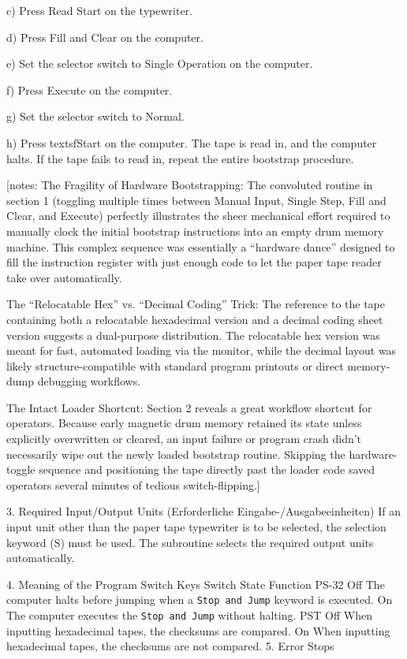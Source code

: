 \documentclass{article}
\begin{document}
\begin{enumerate}
c) Press \textsf{Read Start} on the typewriter.

d) Press \textsf{Fill and Clear} on the computer.

e) Set the selector switch to \textsf{Single Operation} on the computer.

f) Press \textsf{Execute} on the computer.

g) Set the selector switch to \textsf{Normal}.

h) Press textsf{Start} on the computer. The tape is read in, and the computer halts. If the tape fails to read in, repeat the entire bootstrap procedure.

[notes: The Fragility of Hardware Bootstrapping: The convoluted routine in section 1 (toggling multiple times between Manual Input, Single Step, Fill and Clear, and Execute) perfectly illustrates the sheer mechanical effort required to manually clock the initial bootstrap instructions into an empty drum memory machine. This complex sequence was essentially a ``hardware dance'' designed to fill the instruction register with just enough code to let the paper tape reader take over automatically.

The ``Relocatable Hex'' vs. ``Decimal Coding'' Trick: The reference to the tape containing both a relocatable hexadecimal version and a decimal coding sheet version suggests a dual-purpose distribution. The relocatable hex version was meant for fast, automated loading via the monitor, while the decimal layout was likely structure-compatible with standard program printouts or direct memory-dump debugging workflows.

The Intact Loader Shortcut: Section 2 reveals a great workflow shortcut for operators. Because early magnetic drum memory retained its state unless explicitly overwritten or cleared, an input failure or program crash didn't necessarily wipe out the newly loaded bootstrap routine. Skipping the hardware-toggle sequence and positioning the tape directly past the loader code saved operators several minutes of tedious switch-flipping.]

3. Required Input/Output Units (Erforderliche Eingabe-/Ausgabeeinheiten)
If an input unit other than the paper tape typewriter is to be selected, the selection keyword (S) must be used. The subroutine selects the required output units automatically.

4. Meaning of the Program Switch Keys 
Switch      State   Function
PS-32       Off     The computer halts before jumping when a \texttt{Stop and Jump} keyword is executed.
            On      The computer executes the \texttt{Stop and Jump} without halting.
PST         Off     When inputting hexadecimal tapes, the checksums are compared.
            On      When inputting hexadecimal tapes, the checksums are not compared.
5. Error Stops 


\end{enumerate}
\end{document}
